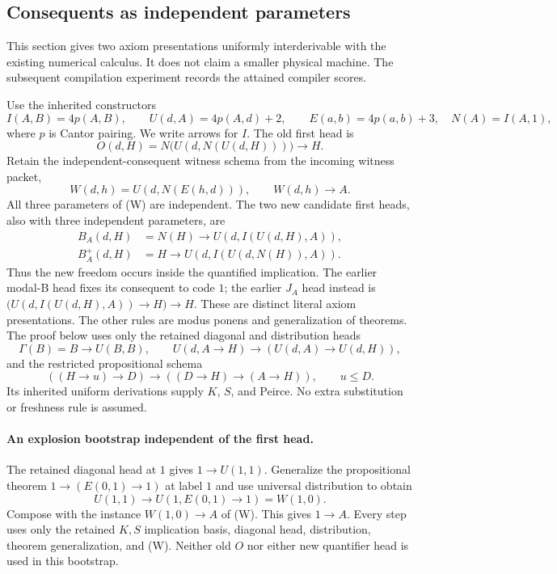 \subsection{Consequents as independent parameters}
\label{sec:generalized-modal-heads}
This section gives two axiom presentations uniformly interderivable with the
existing numerical calculus. It does not claim a smaller physical machine.
The subsequent compilation experiment records the attained compiler scores.

Use the inherited constructors
\[
 I(A,B)=4p(A,B),\qquad U(d,A)=4p(A,d)+2,\qquad E(a,b)=4p(a,b)+3,
 \quad N(A)=I(A,1),
\]
where $p$ is Cantor pairing. We write arrows for $I$. The old first head is
\[
 O(d,H)=N\bigl(U(d,N(U(d,H)))\bigr)\to H.
\]
Retain the independent-consequent witness schema from the incoming witness
packet,
\[
 W(d,h)=U(d,N(E(h,d))),\qquad W(d,h)\to A.                 \tag{W}
\]
All three parameters of (W) are independent. The two new candidate first
heads, also with three independent parameters, are
\begin{align*}
 B_A(d,H)&=N(H)\to U(d,I(U(d,H),A)),\\
 B_A^+(d,H)&=H\to U(d,I(U(d,N(H)),A)).
\end{align*}
Thus the new freedom occurs inside the quantified implication. The earlier
modal-B head fixes its consequent to code $1$; the earlier $J_A$ head
instead is $\bigl(U(d,I(U(d,H),A))\to H\bigr)\to H$.
These are distinct literal axiom presentations. The other rules are
modus ponens and generalization of theorems. The proof below uses only the
retained diagonal and distribution heads
\[
 \Gamma(B)=B\to U(B,B),\qquad
 U(d,A\to H)\to(U(d,A)\to U(d,H)),
\]
and the restricted propositional schema
\[
 ((H\to u)\to D)\to((D\to H)\to(A\to H)),\qquad u\le D.
\]
Its inherited uniform derivations supply $K$, $S$, and Peirce. No extra
substitution or freshness rule is assumed.

\paragraph{An explosion bootstrap independent of the first head.}
The retained diagonal head at $1$ gives $1\to U(1,1)$.
Generalize the propositional theorem
$1\to(E(0,1)\to1)$ at label $1$ and use universal distribution to obtain
\[
 U(1,1)\to U(1,E(0,1)\to1)=W(1,0).
\]
Compose with the instance $W(1,0)\to A$ of (W). This gives $1\to A$.
Every step uses only the retained $K,S$ implication basis, diagonal head,
distribution, theorem generalization, and (W). Neither old $O$ nor either
new quantifier head is used in this bootstrap.

